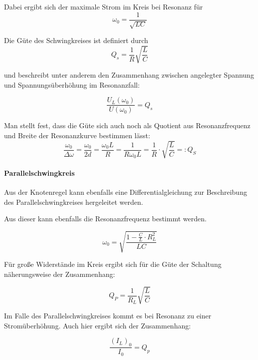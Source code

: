\documentclass[12pt,a4paper]{article}
\begin{document}
Dabei ergibt sich der maximale Strom im Kreis bei Resonanz für
\begin{equation}
\omega_0 = \frac{1}{\sqrt{LC}}
\end{equation} 

Die Güte des Schwingkreises ist definiert durch
\begin{equation}
Q_s = \frac{1}{R} \sqrt{\frac{L}{C}}
\end{equation}

und beschreibt unter anderem den Zusammenhang zwischen angelegter Spannung und Spannungsüberhöhung im Resonanzfall:

\begin{equation}
\frac{U_L(\omega_0)}{U(\omega_0)} = Q_s 
\label{equ:Güte_Spannungsüberhöhung}
\end{equation}

Man stellt fest, dass die Güte sich auch noch als Quotient aus Resonanzfrequenz und Breite der Resonanzkurve bestimmen lässt:
\begin{equation}
\dfrac{\omega_0}{\Delta \omega} = \dfrac{\omega_0}{2d} = \dfrac{\omega_0 L}{R} = \dfrac{1}{R \omega_0 L} = \dfrac{1}{R} \cdot \sqrt{\dfrac{L}{C}} =: Q_S
\label{equ:Güte_Resonanzbreite}
\end{equation}


\paragraph{Parallelschwingkreis}
Aus der Knotenregel kann ebenfalls eine Differentialgleichung zur Beschreibung des Parallelschwingkreises hergeleitet werden.

Aus dieser kann ebenfalls die Resonanzfrequenz bestimmt werden.

\begin{equation}
\omega_0 = \sqrt{\frac{1-\frac{C}{L}\cdot R_L^2}{LC}}
\end{equation} 

Für große Widerstände im Kreis ergibt sich für die Güte der Schaltung näherungsweise der Zusammenhang:

\begin{equation}
Q_P = \frac{1}{R_L} \sqrt{\frac{L}{C}}
\label{equ:Güte_Bauteile}
\end{equation}

Im Falle des Parallelschwingkreises kommt es bei Resonanz zu einer Stromüberhöhung. Auch hier ergibt sich der Zusammenhang:

\begin{equation}
\frac{(I_L)_0}{I_0} = Q_p
\end{equation}
\end{document}
